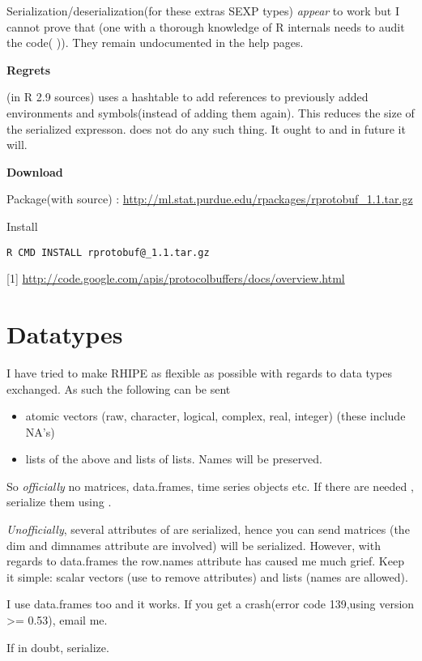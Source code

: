 \documentclass[letterpaper,10pt,english]{manual}
\begin{document}
Serialization/deserialization(for these extras SEXP types)  \emph{appear} to work but I cannot prove that (one with a thorough knowledge of R internals needs to audit the code(  )). They remain undocumented in the help pages.

\textbf{Regrets}

 (in R 2.9 sources) uses a hashtable to add references to previously added environments and symbols(instead of adding them again). This reduces the size of the serialized expresson.  does not do any such thing. It ought to and in future it will.

\textbf{Download}

Package(with source) : \href{http://ml.stat.purdue.edu/rpackages/rprotobuf\_1.1.tar.gz}{http://ml.stat.purdue.edu/rpackages/rprotobuf\_1.1.tar.gz}

Install

\begin{Verbatim}[commandchars=@\[\]]
R CMD INSTALL rprotobuf@_1.1.tar.gz
\end{Verbatim}

{[}1{]} \href{http://code.google.com/apis/protocolbuffers/docs/overview.html}{http://code.google.com/apis/protocolbuffers/docs/overview.html}

\resetcurrentobjects
\hypertarget{--doc-datatypes}{}

\chapter{Datatypes}

I have tried to make RHIPE as flexible as possible with regards to data types exchanged. As such the following can be sent
\begin{itemize}
\item {} 
atomic vectors (raw, character, logical, complex, real, integer) (these include NA's)

\item {} 
lists of the above and lists of lists. Names will be preserved.

\end{itemize}

So \emph{officially} no matrices, data.frames, time series objects etc. If there are needed , serialize them using  .

\emph{Unofficially}, several attributes of are serialized, hence you can send matrices (the dim and  dimnames attribute are involved) will be serialized.
However, with regards to data.frames the row.names attribute has caused me much grief. Keep it simple: scalar vectors (use  to remove attributes) and lists (names are allowed).

I use data.frames too and it works. If you get a crash(error code 139,using version \textgreater{}= 0.53), email me.

If in doubt, serialize.


\renewcommand{\indexname}{Module Index}
\printmodindex
\renewcommand{\indexname}{Index}
\printindex
\end{document}
